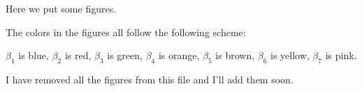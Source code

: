 Here we put some figures.

The colors in the figures all follow the following scheme:

$\beta_1$ is blue, $\beta_2$ is red, $\beta_3$ is green, $\beta_4$ is orange,
$\beta_5$ is brown, $\beta_6$ is yellow, $\beta_7$ is pink.

I have removed all the figures from this file and I'll add them soon.

%
%
